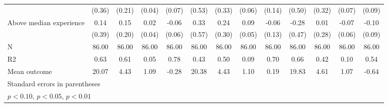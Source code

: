 {\begin{tabular}{l*{12}{c}}
            &      (0.36)         &      (0.21)         &      (0.04)         &      (0.07)         &      (0.53)         &      (0.33)         &      (0.06)         &      (0.14)         &      (0.50)         &      (0.32)         &      (0.07)         &      (0.09)         \\
\addlinespace
Above median experience&        0.14         &        0.15         &        0.02         &       -0.06         &        0.33         &        0.24         &        0.09\sym{*}  &       -0.06         &       -0.28         &        0.01         &       -0.07         &       -0.10         \\
            &      (0.39)         &      (0.20)         &      (0.04)         &      (0.06)         &      (0.57)         &      (0.30)         &      (0.05)         &      (0.13)         &      (0.47)         &      (0.28)         &      (0.06)         &      (0.09)         \\
\midrule
N           &       86.00         &       86.00         &       86.00         &       86.00         &       86.00         &       86.00         &       86.00         &       86.00         &       86.00         &       86.00         &       86.00         &       86.00         \\
R2          &        0.63         &        0.61         &        0.05         &        0.78         &        0.43         &        0.50         &        0.09         &        0.70         &        0.66         &        0.42         &        0.10         &        0.54         \\
Mean outcome&       20.07         &        4.43         &        1.09         &       -0.28         &       20.38         &        4.43         &        1.10         &        0.19         &       19.83         &        4.61         &        1.07         &       -0.64         \\
\bottomrule
\multicolumn{13}{l}{\footnotesize Standard errors in parentheses}\\
\multicolumn{13}{l}{\footnotesize \sym{*} \(p<0.10\), \sym{**} \(p<0.05\), \sym{***} \(p<0.01\)}\\
\end{tabular}
}
